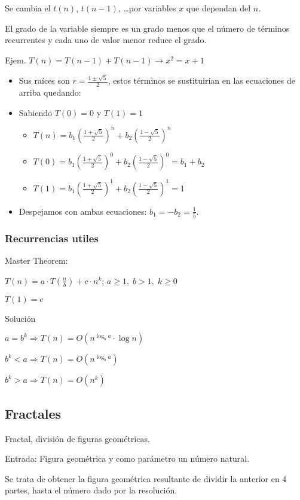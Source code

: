 Se cambia el $t(n)$, $t(n-1)$, \ldots por variables $x$ que dependan del $n$.

El grado de la variable siempre es un grado menos que el número de términos recurrentes y cada uno de valor menor reduce el grado.

Ejem. $T(n)=T(n-1)+T(n-1) \rightarrow x^2= x + 1$
\begin{itemize}
  \item Sus raíces son $r = \frac{1\pm \sqrt{5}}{2}$, estos términos se sustituirían en las ecuaciones de arriba quedando:
  \item Sabiendo $T(0) = 0$ y $T(1)=1$
  \begin{itemize}
    \item $T(n)= b_1(\frac{1+ \sqrt{5}}{2})^n + b_2(\frac{1- \sqrt{5}}{2})^n$
    \item $T(0)= b_1(\frac{1+ \sqrt{5}}{2})^0 + b_2(\frac{1- \sqrt{5}}{2})^0 = b_1 + b_2$
    \item $T(1)= b_1(\frac{1+ \sqrt{5}}{2})^1 + b_2(\frac{1- \sqrt{5}}{2})^1 = 1$
  \end{itemize}
  \item Despejamos con ambas ecuaciones: $b_1 = -b_2 = \frac{1}{5}$.
\end{itemize}

\subsubsection{Recurrencias utiles}
Master Theorem:

$T(n) = a \cdot T(\frac{n}{b}) + c \cdot n^k$; $a \geq 1,\; b > 1,\; k \geq 0$

$T(1)=c$

Solución

$a = b^k \Rightarrow T(n) = O(n^{\log_b a} \cdot \log n)$

$b^k < a \Rightarrow T(n) = O(n^{\log_b a})$

$b^k > a \Rightarrow T(n) = O(n^{k})$

\subsection{Fractales}
Fractal, división de figuras geométricas.

Entrada: Figura geométrica y como parámetro un número natural.

Se trata de obtener la figura geométrica resultante de dividir la anterior en 4 partes, hasta el número dado por la resolución.


